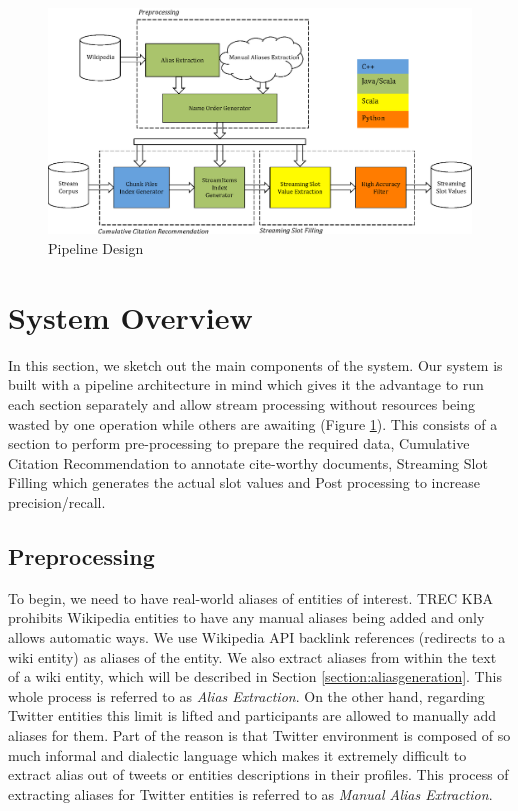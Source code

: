 
\begin{figure}
\centering
\includegraphics[width=6in]{./images/sdl.eps}
\vspace*{-.1in} \caption{Pipeline Design }\label{fig:system}
\vspace*{-.2in}
\end{figure}

\section{System Overview}

In this section, we sketch out the main components of the system. Our system is built with a pipeline architecture in mind which gives it the advantage to run each section separately and allow stream processing without resources being wasted by one operation while others are awaiting (Figure \ref{fig:system}). This consists of a section to perform pre-processing to prepare the required data, Cumulative Citation Recommendation to annotate cite-worthy documents, Streaming Slot Filling which generates the actual slot values and Post processing to increase precision/recall. 


\subsection{Preprocessing}

To begin, we need to have real-world aliases of entities of interest. TREC KBA prohibits Wikipedia entities to have any manual aliases being added and only allows automatic ways. We use Wikipedia API backlink references (redirects to a wiki entity) as aliases of the entity. We also extract  aliases from within the text of a wiki entity, which will be described in Section \ref{section:aliasgeneration}. This whole process is referred to as \textit{Alias Extraction}. On the other hand, regarding Twitter entities this limit is lifted and participants are allowed to manually add aliases for them. Part of the reason is that Twitter environment is composed of so much informal and dialectic language which makes it extremely difficult to extract alias out of tweets or entities descriptions in their profiles. This process of extracting aliases for Twitter entities is referred to as \textit{Manual Alias Extraction}.

